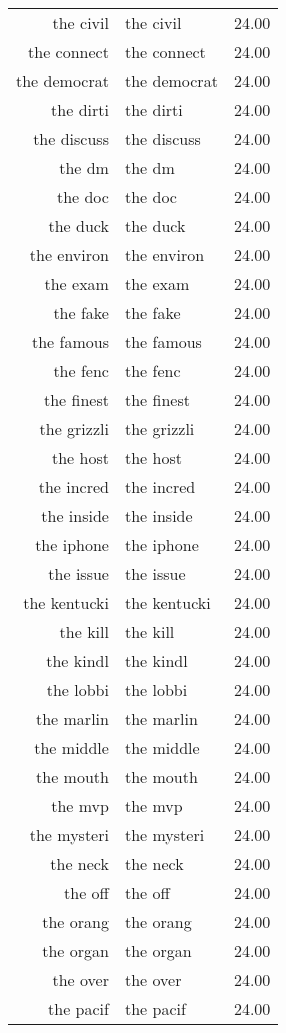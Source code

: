 \begin{table}[ht]
\begin{tabular}{rlr}
  the civil & the civil & 24.00 \\ 
  the connect & the connect & 24.00 \\ 
  the democrat & the democrat & 24.00 \\ 
  the dirti & the dirti & 24.00 \\ 
  the discuss & the discuss & 24.00 \\ 
  the dm & the dm & 24.00 \\ 
  the doc & the doc & 24.00 \\ 
  the duck & the duck & 24.00 \\ 
  the environ & the environ & 24.00 \\ 
  the exam & the exam & 24.00 \\ 
  the fake & the fake & 24.00 \\ 
  the famous & the famous & 24.00 \\ 
  the fenc & the fenc & 24.00 \\ 
  the finest & the finest & 24.00 \\ 
  the grizzli & the grizzli & 24.00 \\ 
  the host & the host & 24.00 \\ 
  the incred & the incred & 24.00 \\ 
  the inside & the inside & 24.00 \\ 
  the iphone & the iphone & 24.00 \\ 
  the issue & the issue & 24.00 \\ 
  the kentucki & the kentucki & 24.00 \\ 
  the kill & the kill & 24.00 \\ 
  the kindl & the kindl & 24.00 \\ 
  the lobbi & the lobbi & 24.00 \\ 
  the marlin & the marlin & 24.00 \\ 
  the middle & the middle & 24.00 \\ 
  the mouth & the mouth & 24.00 \\ 
  the mvp & the mvp & 24.00 \\ 
  the mysteri & the mysteri & 24.00 \\ 
  the neck & the neck & 24.00 \\ 
  the off & the off & 24.00 \\ 
  the orang & the orang & 24.00 \\ 
  the organ & the organ & 24.00 \\ 
  the over & the over & 24.00 \\ 
  the pacif & the pacif & 24.00 \\ 

\end{tabular}
\end{table}
